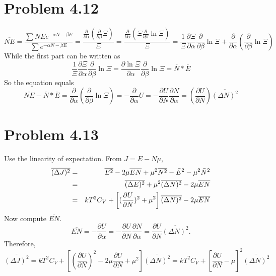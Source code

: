 \documentclass{article}
\begin{document}
\section*{Problem 4.12}
\begin{equation}
	\overline{NE}=\frac{\sum NE e^{- \alpha N- \beta E}}{\sum e^{-\alpha N-\beta E}}=\frac{\frac{\partial}{\partial \alpha}(\frac{\partial}{\partial \beta}\Xi)}{\Xi}=\frac{\frac{\partial}{\partial \alpha}(\Xi \frac{\partial}{\partial \beta}\ln \Xi)}{\Xi}=\frac{1}{\Xi} \frac{\partial \Xi}{\partial \alpha}\frac{\partial}{\partial \beta}\ln \Xi +\frac{\partial}{\partial \alpha}(\frac{\partial}{\partial \beta}\ln \Xi)
\end{equation}
	While the first part can be written as
\begin{equation}
	\frac{1}{\Xi} \frac{\partial \Xi}{\partial \alpha}\frac{\partial}{\partial \beta}\ln \Xi= \frac{\partial \ln \Xi}{\partial \alpha}\frac{\partial}{\partial \beta}\ln \Xi=\overline{N}* \overline{E}
\end{equation}
	So the equation equals
\begin{equation}
	\overline{NE}-\overline{N}* \overline{E}=\frac{\partial}{\partial \alpha}(\frac{\partial}{\partial \beta}\ln \Xi)=-\frac{\partial}{\partial \alpha} U=-\frac{\partial U}{\partial N}\frac{\partial N}{\partial \alpha}= (\frac{\partial U}{\partial N})\overline{(\Delta N)^2}
\end{equation}


\section*{Problem 4.13}
Use the linearity of expectation. From $J=E-N \mu$,
\begin{eqnarray}
\overline{(\Delta J)^{2}} &=& \overline{E^{2}} - 2 \mu \overline{EN} + \mu^{2} \overline{N^{2}} - \bar{E}^{2} - \mu^{2} \bar{N}^{2} \notag \\
&=& \overline{(\Delta E)^{2}} + \mu^{2} \overline{(\Delta N)^{2}} - 2 \mu \overline{EN}\notag  \\
&=& kT^{2} C_{V} + \left[ (\frac{\partial U}{\partial N})^{2} + \mu^{2}  \right]\overline{(\Delta N)^{2}}  - 2 \mu \overline{EN}
\end{eqnarray}
Now compute $\overline{EN} $.
\begin{equation}
\overline{EN} = -\frac{\partial U}{\partial \alpha} = - \frac{\partial U}{\partial N} \frac{\partial N}{\partial \alpha} = \frac{\partial U}{\partial N} \overline{(\Delta N)^{2}}.
\end{equation}
Therefore,
\begin{equation}
\overline{(\Delta J)^{2}} = kT^{2} C_{V} + \left[ (\frac{\partial U}{\partial N})^{2} - 2\mu \frac{\partial U}{\partial N}+ \mu^{2}  \right]\overline{(\Delta N)^{2}} = kT^{2} C_{V} + 
\left[\frac{\partial U}{\partial N} - \mu \right]^{2} \overline{(\Delta N)^{2}}
\end{equation}
\end{document}

